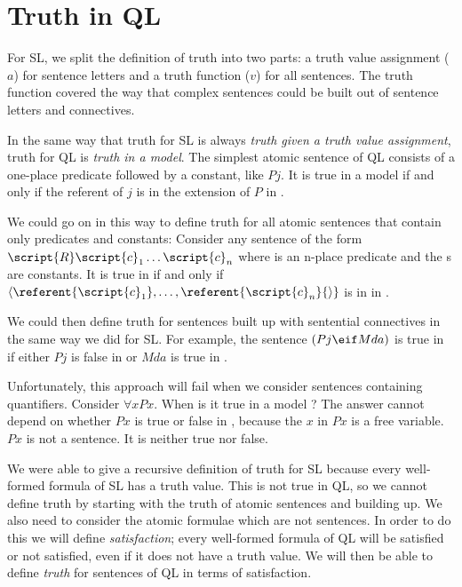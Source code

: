 


\section{Truth in QL}
\label{sec.TruthInQL}
For SL, we split the definition of truth into two parts: a truth value assignment ($a$) for sentence letters and a truth function ($v$) for all sentences. The truth function covered the way that complex sentences could be built out of sentence letters and connectives.

In the same way that truth for SL is always \emph{truth given a truth value assignment}, truth for QL is \emph{truth in a model}. The simplest atomic sentence of QL consists of a one-place predicate followed by a constant, like $Pj$. It is true in a model  if and only if the referent of $j$ is in the extension of $P$ in .

We could go on in this way to define truth for all atomic sentences that contain only predicates and constants: Consider any sentence of the form $\script{R}\script{c}_1\ldots\script{c}_n$ where  is an n-place predicate and the s are constants. It is true in  if and only if ${\langle}\referent{\script{c}_1},\ldots,\referent{\script{c}_n}{\rangle}$ is in  in .

We could then define truth for sentences built up with sentential connectives in the same way we did for SL. For example, the sentence $(Pj \eif Mda)$ is true in  if either $Pj$ is false in  or $Mda$ is true in .

Unfortunately, this approach will fail when we consider sentences containing quantifiers. Consider $\forall x Px$. When is it true in a model ? The answer cannot depend on whether $Px$ is true or false in , because the $x$ in $Px$ is a free variable. $Px$ is not a sentence. It is neither true nor false.

We were able to give a recursive definition of truth for SL because every well-formed formula of SL has a truth value. This is not true in QL, so we cannot define truth by starting with the truth of atomic sentences and building up. We also need to consider the atomic formulae which are not sentences. In order to do this we will define \emph{satisfaction}; every well-formed formula of QL will be satisfied or not satisfied, even if it does not have a truth value. We will then be able to define \emph{truth} for sentences of QL in terms of satisfaction.



